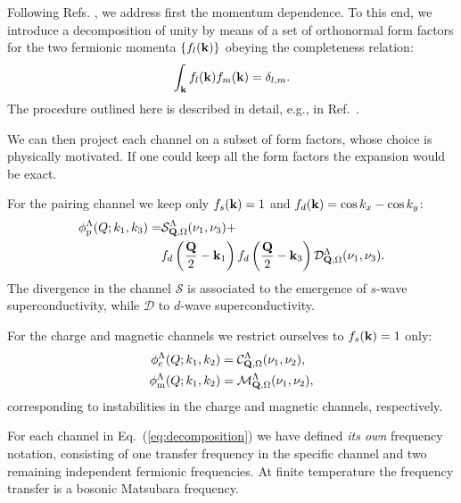 
Following Refs. , we address first the momentum dependence. To this end, we introduce a decomposition of 
unity by means of a set of orthonormal form factors for the two fermionic momenta $\{f_{l}(\mathbf{k})\}$ obeying 
the completeness relation\cite{Lichtenstein2017}:
\begin{equation}
 \int_{\mathbf{k}}  f_{l}(\mathbf{k}) f_{m}(\mathbf{k}) = \delta_{l,m}.
\end{equation}
The procedure outlined here is described in detail, e.g., in Ref.~.

We can then project each channel on a subset of form factors, whose choice is physically motivated\cite{Husemann2009}. 
If one could keep all the  form factors the expansion would be exact.

For the pairing channel we keep only $f_{s}(\mathbf{k}) = 1$ and $f_d(\mathbf{k})=\cos{k_x} - \cos{k_y}$:
\begin{align}
\nonumber
  \phi^{\Lambda}_{\mathrm{p}}(Q;k_1,k_3) =&
    \mathcal{S}^\Lambda_{\mathbf{Q},\Omega}(\nu_1,\nu_3) +   \\ 
    & f_d\left(\frac{\mathbf{Q}}{2}-\mathbf{k}_1\right) f_d\left(\frac{\mathbf{Q}}{2}-\mathbf{k}_3\right) \mathcal{D}^\Lambda_{\mathbf{Q},\Omega}(\nu_1,\nu_3).
\end{align}
The divergence in the channel $\mathcal{S}$ is associated to the emergence of $s$-wave superconductivity, while $\mathcal{D}$  to $d$-wave superconductivity.\cite{Metzner2012,Platt2013}

For the charge and magnetic channels we restrict ourselves to $f_{s}(\mathbf{k})=1$ only:
\begin{align}
  \phi^\Lambda_{\mathrm{c}}(Q;k_1,k_2) &= \mathcal{C}^\Lambda_{\mathbf{Q},\Omega}(\nu_1,\nu_2), \\
  \phi^\Lambda_{\mathrm{m}}(Q;k_1,k_2) &= \mathcal{M}^\Lambda_{\mathbf{Q},\Omega}(\nu_1,\nu_2),
\end{align}
corresponding to instabilities in the charge and magnetic channels, respectively.

For each channel in Eq.~(\ref{eq:decomposition}) we have defined \textit{its own} frequency notation, consisting of one transfer frequency in the specific channel 
and two remaining independent fermionic frequencies. 
 At finite temperature the frequency transfer is a bosonic Matsubara frequency.
 
